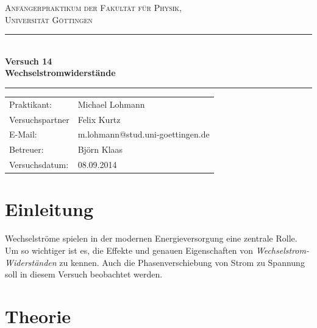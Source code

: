 \documentclass[12pt,a4paper,titlepage,headinclude,bibtotoc]{scrartcl}
\begin{document}
\begin{titlepage}
\centering
\textsc{\Large Anfängerpraktikum der Fakultät für
  Physik,\\[1.5ex] Universität Göttingen}

\vspace*{4.2cm}

\rule{\textwidth}{1pt}\\[0.5cm]
{\huge \bfseries
Versuch 14\\[1.5ex]
  Wechselstromwiderstände
  }\\[0.5cm]
\rule{\textwidth}{1pt}

\vspace*{2.5cm}

\begin{Large}
\begin{tabular}{ll}
Praktikant: &  Michael Lohmann\\
 Versuchspartner &  Felix Kurtz\\
 E-Mail: & m.lohmann@stud.uni-goettingen.de\\
 Betreuer: & Björn Klaas\\
 Versuchsdatum: & 08.09.2014\\
\end{tabular}
\end{Large}

\vspace*{0.8cm}

\begin{Large}
\end{Large}

\end{titlepage}

\tableofcontents

\newpage

\section{Einleitung}
\label{sec:einleitung}
Wechselströme spielen in der modernen Energieversorgung eine zentrale Rolle.
Um so wichtiger ist es, die Effekte und genauen Eigenschaften von \emph{Wechselstrom-Widerständen} zu kennen.
Auch die Phasenverschiebung von Strom zu Spannung soll in diesem Versuch beobachtet werden.
\section{Theorie}
\label{sec:theorie}
\end{document}
